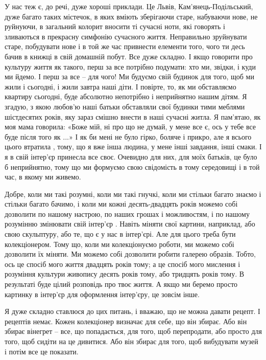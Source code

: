 
У нас теж є, до речі, дуже хороші приклади. Це Львів, Кам'янець-Подільський,
дуже багато таких містечок, в яких вміють зберігаючи старе, набуваючи нове, не
руйнуючи, в загальний колорит вносити ті сучасні ноти, які говорять і
зливаються в прекрасну симфонію сучасного життя. Неправильно зруйнувати старе,
побудувати нове і в той же час привнести елементи того, чого ти десь бачив в
книжці в свій домашній побут. Все дуже складно. І якщо говорити про культуру
життя як такого, перш за все потрібно подумати: хто ми, звідки, і куди ми
йдемо. І перш за все – для чого! Ми будуємо свій будинок для того, щоб ми жили
і сьогодні, і жили завтра наші діти. І повірте, то, як ми обставляємо квартиру
сьогодні, буде абсолютно непотрібно і неприйнятно нашим дітям. Я згадую, з якою
любов'ю наші батьки обставляли свої будинки тими меблями шістдесятих років, яку
зараз смішно внести в наші сучасні житла. Я пам'ятаю, як моя мама говорила:
«Боже мій, ні про що не думай, у мене все є, ось у тебе все буде після того як
...» І як би мені не було гірко, боляче і прикро, але я всього цього втратила ,
тому, що я вже інша людина, у мене інші завдання, інші смаки. І я в свій
інтер'єр принесла все своє. Очевидно для них, для моїх батьків, це було б
неприйнятно, тому що ми формуємо свою свідомість в тому середовищі і в той час,
в якому ми живемо.


Добре, коли ми такі розумні, коли ми такі гнучкі, коли ми стільки багато знаємо
і стільки багато бачимо, і коли ми кожні десять-двадцять років можемо собі
дозволити по нашому настрою, по наших грошах і можливостям, і по нашому
розумінню змінювати свій інтер'єр . Навіть міняти свої картини, наприклад, або
свою скульптуру, або те, що є у нас в інтер'єрі. Але для цього треба бути
колекціонером. Тому що, коли ми колекціонуємо роботи, ми можемо собі дозволити
їх міняти. Ми можемо собі дозволити робити галерею образів. Тобто, ось це
спосіб мого життя двадцять років тому; а це спосіб мого мислення і розуміння
культури живопису десять років тому, або тридцять років тому. В результаті буде
цілий розповідь про твоє життя. А якщо ми беремо просто картинку в інтер'єр для
оформлення інтер'єру, це зовсім інше.

Я дуже складно ставлюся до цих питань, і вважаю, що не можна давати рецепт. І
рецептів немає. Кожен колекціонер визначає для себе, що він збирає. Або він
збирає вінегрет – все, що попадається, для того, щоб перепродати, або просто
для того, щоб сидіти на це дивитися. Або він збирає для того, щоб вибудувати
музей і потім все це показати.

